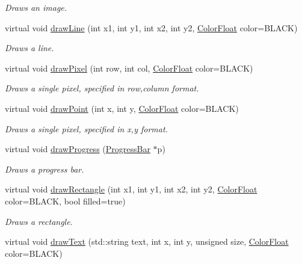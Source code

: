 \begin{DoxyCompactItemize}
\begin{DoxyCompactList}\small\item\em Draws an image. \end{DoxyCompactList}\item 
virtual void \hyperlink{classtsgl_1_1_canvas_a6e5c605b03a69e615fe4ccee30be1959}{draw\+Line} (int x1, int y1, int x2, int y2, \hyperlink{structtsgl_1_1_color_float}{Color\+Float} color=B\+L\+A\+C\+K)
\begin{DoxyCompactList}\small\item\em Draws a line. \end{DoxyCompactList}\item 
virtual void \hyperlink{classtsgl_1_1_canvas_af17d456eca4ad5a55842f2cf02f48a97}{draw\+Pixel} (int row, int col, \hyperlink{structtsgl_1_1_color_float}{Color\+Float} color=B\+L\+A\+C\+K)
\begin{DoxyCompactList}\small\item\em Draws a single pixel, specified in row,column format. \end{DoxyCompactList}\item 
virtual void \hyperlink{classtsgl_1_1_canvas_a6c17c90cd13f7b0184a25e4acc2b7426}{draw\+Point} (int x, int y, \hyperlink{structtsgl_1_1_color_float}{Color\+Float} color=B\+L\+A\+C\+K)
\begin{DoxyCompactList}\small\item\em Draws a single pixel, specified in x,y format. \end{DoxyCompactList}\item 
virtual void \hyperlink{classtsgl_1_1_canvas_aea792059486ebe6d25d7f81bdadf751d}{draw\+Progress} (\hyperlink{classtsgl_1_1_progress_bar}{Progress\+Bar} $\ast$p)
\begin{DoxyCompactList}\small\item\em Draws a progress bar. \end{DoxyCompactList}\item 
virtual void \hyperlink{classtsgl_1_1_canvas_a752754cd16d14447cb5e5b0438bebf16}{draw\+Rectangle} (int x1, int y1, int x2, int y2, \hyperlink{structtsgl_1_1_color_float}{Color\+Float} color=B\+L\+A\+C\+K, bool filled=true)
\begin{DoxyCompactList}\small\item\em Draws a rectangle. \end{DoxyCompactList}\item 
virtual void \hyperlink{classtsgl_1_1_canvas_a3457e7ebd17fa5003025ff6bcaaeedf6}{draw\+Text} (std\+::string text, int x, int y, unsigned size, \hyperlink{structtsgl_1_1_color_float}{Color\+Float} color=B\+L\+A\+C\+K)

\end{DoxyCompactItemize}
